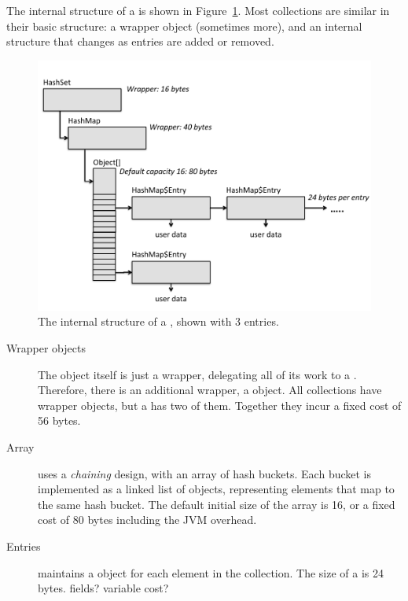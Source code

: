 The internal structure of a  is shown in
Figure~\ref{fig:inside-hashset}. Most
collections are similar in their basic structure: a wrapper
object (sometimes more), and an internal structure that changes as entries are
added or removed.
 \begin{figure}
  \centering
 \includegraphics[width=.80\textwidth]{part1/Figures/collections/inside-hashset.pdf}
  \caption{The internal structure of a , shown with 3 entries.}
  \label{fig:inside-hashset}
\end{figure}


\begin{description}
\item[Wrapper objects] The  object itself is just a wrapper,
delegating all of its work to a . Therefore, there is an additional wrapper,
a  object. All
collections have wrapper objects, but a  has two of them. 
Together they incur a fixed cost of 56 bytes.
 
\item[Array]  uses a \emph{chaining} design, with an array
of hash buckets. Each bucket is implemented as a linked list of
 objects, representing elements that map to the same hash
bucket. The default initial size of the array is 16, or a fixed cost of 80
bytes including the JVM overhead.
 
\item[Entries]  maintains a
 object for each element in the collection. The size of a
 is 24 bytes. fields? variable cost?

\end{description}

